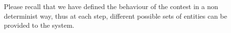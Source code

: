 Please recall that we have defined the behaviour of the contest in a non determinist way, thus 
at each step, different possible sets of entities can be provided to the system. 

%
%
%






